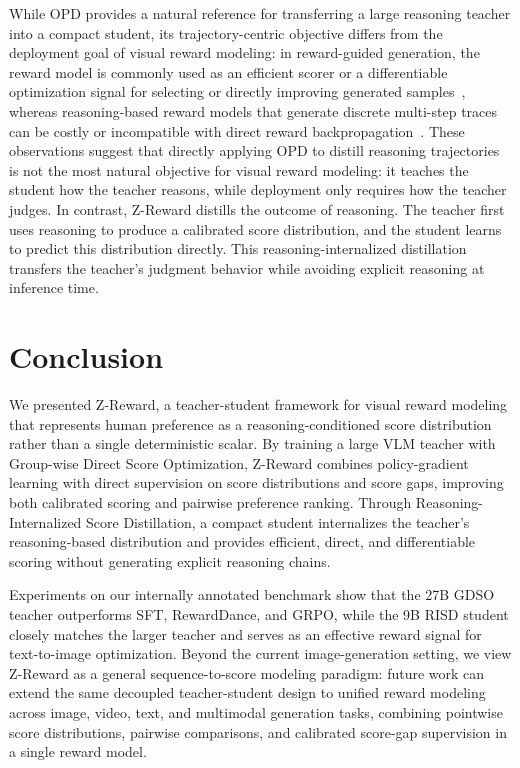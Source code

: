 \documentclass{article}
\newcommand{\mname}{Z-Reward\xspace}
\newcommand{\teaname}{GDSO\xspace}
\newcommand{\stuname}{RISD\xspace}
\begin{document}
While OPD provides a natural reference for transferring a large reasoning teacher into a compact student, its trajectory-centric objective differs from the deployment goal of visual reward modeling: in reward-guided generation, the reward model is commonly used as an efficient scorer or a differentiable optimization signal for selecting or directly improving generated samples~\cite{xu2023imagereward,clark2024directlyfinetuningdiffusionmodels,yang2026joint}, whereas reasoning-based reward models that generate discrete multi-step traces can be costly or incompatible with direct reward backpropagation~\cite{guo2026leveraging}. These observations suggest that directly applying OPD to distill reasoning trajectories is not the most natural objective for visual reward modeling: it teaches the student how the teacher reasons, while deployment only requires how the teacher judges. In contrast, \mname distills the outcome of reasoning. The teacher first uses reasoning to produce a calibrated score distribution, and the student learns to predict this distribution directly. This reasoning-internalized distillation transfers the teacher's judgment behavior while avoiding explicit reasoning at inference time.



\section{Conclusion}

We presented \mname, a teacher-student framework for visual reward modeling that represents human preference as a reasoning-conditioned score distribution rather than a single deterministic scalar. By training a large VLM teacher with Group-wise Direct Score Optimization, \mname combines policy-gradient learning with direct supervision on score distributions and score gaps, improving both calibrated scoring and pairwise preference ranking. Through Reasoning-Internalized Score Distillation, a compact student internalizes the teacher's reasoning-based distribution and provides efficient, direct, and differentiable scoring without generating explicit reasoning chains.

Experiments on our internally annotated benchmark show that the 27B \teaname teacher outperforms SFT, RewardDance, and GRPO, while the 9B \stuname student closely matches the larger teacher and serves as an effective reward signal for text-to-image optimization. Beyond the current image-generation setting, we view \mname as a general sequence-to-score modeling paradigm: future work can extend the same decoupled teacher-student design to unified reward modeling across image, video, text, and multimodal generation tasks, combining pointwise score distributions, pairwise comparisons, and calibrated score-gap supervision in a single reward model.
\end{document}
